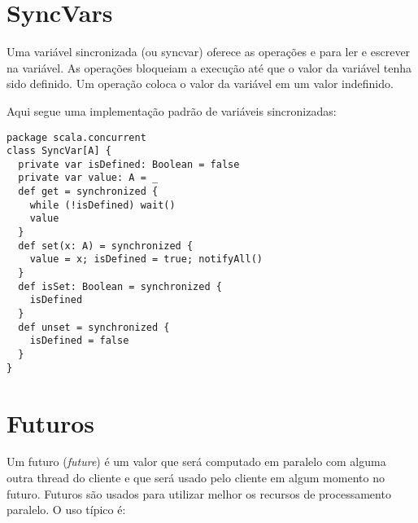 
\section{SyncVars}

Uma variável sincronizada (ou syncvar) oferece as operações  e 
 para ler e escrever na variável. As operações  bloqueiam
a execução até que o valor da variável tenha sido definido. Um operação 
coloca o valor da variável em um valor indefinido.

Aqui segue uma implementação padrão de variáveis sincronizadas:
\begin{lstlisting}
package scala.concurrent
class SyncVar[A] {
  private var isDefined: Boolean = false
  private var value: A = _
  def get = synchronized {
    while (!isDefined) wait()
    value
  }
  def set(x: A) = synchronized {
    value = x; isDefined = true; notifyAll()
  }
  def isSet: Boolean = synchronized {
    isDefined
  }
  def unset = synchronized {
    isDefined = false
  }
}
\end{lstlisting}

\section{Futuros}
\label{sec:futures}

Um futuro ({\em future}) é um valor que será computado em paralelo com alguma outra thread do cliente e
que será usado pelo cliente em algum momento no futuro. 
Futuros são usados para utilizar melhor os recursos de processamento paralelo.
O uso típico é:

